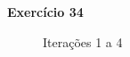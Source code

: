 \documentclass[a4paper,11pt]{article}
\begin{document}
\newpage

\noindent \textbf{Exercício 34}

\begin{figure}[H]
	\centering
	\begin{minipage}{0.49\textwidth}
		\centering
		\caption{Iterações 1 a 4}
	\end{minipage}
	\hfill
	\begin{minipage}{0.49\textwidth}
		\centering

\end{minipage}
\end{figure}
\end{document}
